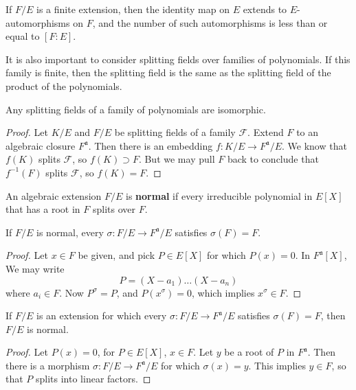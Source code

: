 \begin{corollary}
    If $F/E$ is a finite extension, then the identity map on $E$ extends to $E$-automorphisms on $F$, and the number of such automorphisms is less than or equal to $[F:E]$.
\end{corollary}

It is also important to consider splitting fields over families of polynomials. If this family is finite, then the splitting field is the same as the splitting field of the product of the polynomials.

\begin{theorem}
    Any splitting fields of a family of polynomials are isomorphic.
\end{theorem}
\begin{proof}
    Let $K/E$ and $F/E$ be splitting fields of a family $\mathcal{F}$. Extend $F$ to an algebraic closure $F^{\mathfrak{a}}$. Then there is an embedding $f:K/E \to F^{\mathfrak{a}}/E$. We know that $f(K)$ splits $\mathcal{F}$, so $f(K) \supset F$. But we may pull $F$ back to conclude that $f^{-1}(F)$ splits $\mathcal{F}$, so $f(K) = F$.
\end{proof}

An algebraic extension $F/E$ is {\bf normal} if every irreducible polynomial in $E[X]$ that has a root in $F$ splits over $F$.

\begin{lemma}
    If $F/E$ is normal, every $\sigma:F/E \to F^{\mathfrak{a}}/E$ satisfies $\sigma(F) = F$.
\end{lemma}
\begin{proof}
    Let $x \in F$ be given, and pick $P \in E[X]$ for which $P(x) = 0$. In $F^{\mathfrak{a}}[X]$, We may write
    \[ P = (X - a_1) \dots (X - a_n) \]
    where $a_i \in F$. Now $P^\sigma = P$, and $P(x^\sigma) = 0$, which implies $x^\sigma \in F$.
\end{proof}

\begin{theorem}
    If $F/E$ is an extension for which every $\sigma:F/E \to F^{\mathfrak{a}}/E$ satisfies $\sigma(F) = F$, then $F/E$ is normal.
\end{theorem}
\begin{proof}
    Let $P(x) = 0$, for $P \in E[X]$, $x \in F$. Let $y$ be a root of $P$ in $F^{\mathfrak{a}}$. Then there is a morphism $\sigma: F/E \to F^{\mathfrak{a}}/E$ for which $\sigma(x) = y$. This implies $y \in F$, so that $P$ splits into linear factors.
\end{proof}

